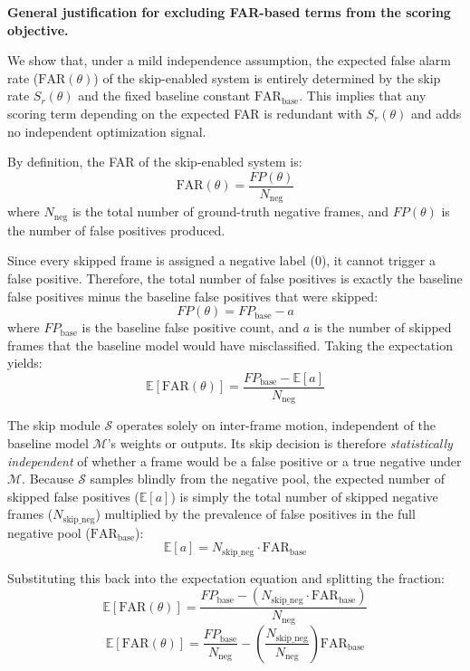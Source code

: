 \textbf{General justification for excluding FAR-based terms from the scoring objective.}

We show that, under a mild independence assumption, the expected false alarm rate ($\mathrm{FAR}(\theta)$) of the skip-enabled system is entirely determined by the skip rate $S_r(\theta)$ and the fixed baseline constant $\mathrm{FAR}_{\text{base}}$. This implies that any scoring term depending on the expected FAR is redundant with $S_r(\theta)$ and adds no independent optimization signal.

By definition, the FAR of the skip-enabled system is:
\[ \mathrm{FAR}(\theta) = \frac{FP(\theta)}{N_{\text{neg}}} \]
where $N_{\text{neg}}$ is the total number of ground-truth negative frames, and $FP(\theta)$ is the number of false positives produced. 

Since every skipped frame is assigned a negative label ($0$), it cannot trigger a false positive. Therefore, the total number of false positives is exactly the baseline false positives minus the baseline false positives that were skipped:
\[ FP(\theta) = FP_{\text{base}} - a \]
where $FP_{\text{base}}$ is the baseline false positive count, and $a$ is the number of skipped frames that the baseline model would have misclassified. Taking the expectation yields:
\[ \mathbb{E}[\mathrm{FAR}(\theta)] = \frac{FP_{\text{base}} - \mathbb{E}[a]}{N_{\text{neg}}} \]

The skip module $\mathcal{S}$ operates solely on inter-frame motion, independent of the baseline model $\mathcal{M}$'s weights or outputs. Its skip decision is therefore \emph{statistically independent} of whether a frame would be a false positive or a true negative under $\mathcal{M}$. Because $\mathcal{S}$ samples blindly from the negative pool, the expected number of skipped false positives ($\mathbb{E}[a]$) is simply the total number of skipped negative frames ($N_{\text{skip\_neg}}$) multiplied by the prevalence of false positives in the full negative pool ($\mathrm{FAR}_{\text{base}}$):
\[ \mathbb{E}[a] = N_{\text{skip\_neg}} \cdot \mathrm{FAR}_{\text{base}} \]

Substituting this back into the expectation equation and splitting the fraction:
\[ \mathbb{E}[\mathrm{FAR}(\theta)] = \frac{FP_{\text{base}} - (N_{\text{skip\_neg}} \cdot \mathrm{FAR}_{\text{base}})}{N_{\text{neg}}} \]
\[ \mathbb{E}[\mathrm{FAR}(\theta)] = \frac{FP_{\text{base}}}{N_{\text{neg}}} - \left( \frac{N_{\text{skip\_neg}}}{N_{\text{neg}}} \right) \mathrm{FAR}_{\text{base}} \]

